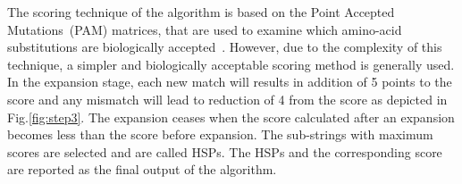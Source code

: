 The scoring technique of the algorithm is based on the Point Accepted Mutations~(PAM) matrices, that are used to examine which amino-acid substitutions are biologically accepted~\cite{sotiriades2007design}. 
However, due to the complexity of this technique, a simpler and biologically acceptable scoring method is generally used. 
In the expansion stage, each new match will results in addition of 5 points to the score and any mismatch will lead to reduction of 4 from the score as depicted in Fig.\ref{fig:step3}.
The expansion ceases when the score calculated after an expansion becomes less than the score before expansion.
The sub-strings with maximum scores are selected and are called HSPs.
The HSPs and the corresponding score are reported as the final output of the algorithm.

